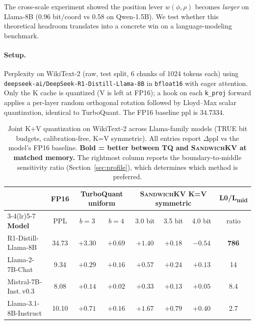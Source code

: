 \documentclass[11pt]{article}
\theoremstyle{definition}
\newcommand{\eq}{\textsc{SandwichKV}}
\begin{document}
The cross-scale experiment showed the position lever $w(\phi, \rho)$ becomes
\emph{larger} on Llama-8B (0.96 bit/coord vs 0.58 on Qwen-1.5B). We test
whether this theoretical headroom translates into a concrete win on a
language-modeling benchmark.

\paragraph{Setup.} Perplexity on WikiText-2 (raw, test split, 6 chunks of
1024 tokens each) using \texttt{deepseek-ai/DeepSeek-R1-Distill-Llama-8B} in
\texttt{bfloat16} with eager attention. Only the K cache is quantized
(V is left at FP16); a hook on each \texttt{k\_proj} forward applies a
per-layer random orthogonal rotation followed by Lloyd--Max scalar
quantization, identical to TurboQuant. The FP16 baseline ppl is
$34.7334$.

\begin{table}[t]
\centering
\caption{Joint K+V quantization on WikiText-2 across Llama-family models (TRUE bit budgets, calibration-free, K=V symmetric). All entries report $\Delta\text{ppl}$ vs the model's FP16 baseline. \textbf{Bold = better between TQ and \eq{} at matched memory.} The rightmost column reports the boundary-to-middle sensitivity ratio (Section~\ref{sec:profile}), which determines which method is preferred.}
\label{tab:sandwich-multimodel}
\begin{tabular}{lccccccc}
\toprule
& FP16 & \multicolumn{2}{c}{TurboQuant uniform} & \multicolumn{3}{c}{\eq{} K=V symmetric} & L0/L\textsubscript{mid} \\
\cmidrule(lr){3-4}\cmidrule(lr){5-7}
\textbf{Model} & PPL & $b{=}3$ & $b{=}4$ & 3.0 bit & 3.5 bit & 4.0 bit & ratio \\
\midrule
R1-Distill-Llama-8B  & 34.73 & $+3.30$  & $+0.69$           & $+1.40$ & $\boldsymbol{+0.18}$ & $\boldsymbol{-0.54}$ & \textbf{786} \\
Llama-2-7B-Chat      &  9.34 & $+0.29$  & $+0.16$           & $+0.57$ & $+0.24$ & $\boldsymbol{+0.13}$ &  14   \\
Mistral-7B-Inst.\,v0.3 &  8.08 & $+0.14$  & $\boldsymbol{+0.02}$ & $+0.33$ & $+0.13$ & $+0.05$ &   8.4 \\
Llama-3.1-8B-Instruct & 10.10 & $+0.71$  & $\boldsymbol{+0.16}$ & $+1.67$ & $+0.79$ & $+0.40$ &   2.7 \\
\bottomrule
\end{tabular}
\end{table}
\end{document}
